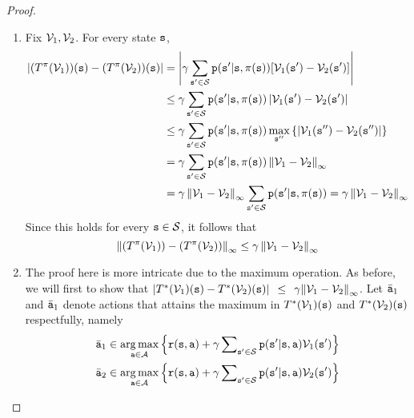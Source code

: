 \begin{proof}
\begin{enumerate}
  \item Fix ${\mathcal{V}_1},{\mathcal{V}_2}$. For every state ${\tt s}$,
\begin{align*}
\left|(T^{\pi}(\mathcal{V}_{1}))({\tt s})-(T^{\pi}(\mathcal{V}_{2}))({\tt s})\right| & =\left|{\gamma\sum_{{\tt s}'\in\mathcal{S}}{{\tt p}({\tt s}'|{\tt s},\pi({\tt s}))[\mathcal{V}_{1}({\tt s}')-\mathcal{V}_{2}({\tt s}')]}}\right|\\
 & \le\gamma\sum_{{\tt s}'\in\mathcal{S}}{\tt p}({\tt s}'|{\tt s},\pi({\tt s}))\left|\mathcal{V}_{1}({\tt s}')-\mathcal{V}_{2}({\tt s}')\right|\\
 & \le\gamma\sum_{{\tt s}'\in\mathcal{S}}{\tt p}({\tt s}'|{\tt s},\pi({\tt s}))\max_{{\tt s}''}\left\{ \left|\mathcal{V}_{1}({\tt s}'')-\mathcal{V}_{2}({\tt s}'')\right|\right\} \\
 & =\gamma\sum_{{\tt s}'\in\mathcal{S}}{\tt p}({\tt s}'|{\tt s},\pi({\tt s}))\left\Vert \mathcal{V}_{1}-\mathcal{V}_{2}\right\Vert _{\infty}\\
 & =\gamma\left\Vert \mathcal{V}_{1}-\mathcal{V}_{2}\right\Vert _{\infty}\sum_{{\tt s}'\in\mathcal{S}}{\tt p}({\tt s}'|{\tt s},\pi({\tt s}))=\gamma\left\Vert {{\mathcal{V}_{1}}-{\mathcal{V}_{2}}}\right\Vert _{\infty}
\end{align*}
Since this holds for every ${\tt s} \in \mathcal{S}$, it follows that
\[\left\Vert (T^{\pi}(\mathcal{V}_{1}))-(T^{\pi}(\mathcal{V}_{2}))\right\Vert _{\infty} \leq \gamma\left\Vert {{\mathcal{V}_{1}}-{\mathcal{V}_{2}}}\right\Vert _{\infty}\]
  \item
The proof here is more intricate due to the maximum operation. As
before, we will first to show that  $|T_{}^*({\mathcal{V}_1})({\tt s}) -
T_{}^*({\mathcal{V}_2})({\tt s})|\;\, \le \;\,\gamma {\left\|
{{\mathcal{V}_1} - {\mathcal{V}_2}} \right\|_\infty }$. 
Let $\bar {{\tt a}}_1$ and $\bar {{\tt a}}_1$ denote actions that attains the maximum in
$T_{}^*({\mathcal{V}_1})({\tt s})$ and $T_{}^*({\mathcal{V}_2})({\tt s})$ respectfully, namely
\begin{align*}
\bar{{\tt a}}_{1} & \in\mathop{\arg\max}\limits _{{\tt a}\in\mathcal{A}}\left\{ {{\tt r}({\tt s},{\tt a})+\gamma\sum\nolimits _{{\tt s}'\in\mathcal{S}}{{\tt p}({\tt s}'|{\tt s},{\tt a}){\mathcal{V}_{1}}({\tt s}')}}\right\} \\
\bar{{\tt a}}_{2} & \in\mathop{\arg\max}\limits _{{\tt a}\in\mathcal{A}}\left\{ {{\tt r}({\tt s},{\tt a})+\gamma\sum\nolimits _{{\tt s}'\in\mathcal{S}}{{\tt p}({\tt s}'|{\tt s},{\tt a}){\mathcal{V}_{2}}({\tt s}')}}\right\} 
\end{align*}

\end{enumerate}
\end{proof}
